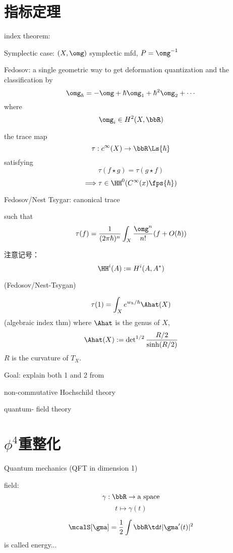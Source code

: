 

\section{指标定理}
index theorem:

Symplectic case: $(X,\omg)$ symplectic mfd,
$P=\omg^{-1}$

Fedosov: a single geometric way
to get deformation quantization and the classification by
$$\omg_{\hbar}=-\omg+\hbar\omg_1+\hbar^2\omg_2+\cdots$$
where
$$\omg_i\in H^2(X,\bbR)$$

\begin{definition}
 the trace map
$$\tau: c^{\infty}(X)\to \bbR\Ls{\hbar}$$
satisfying
$$\tau(f\star g)=\tau(g\star f)$$
$$\Longrightarrow \tau\in \HH^0(C^{\infty}(x)\fps{\hbar})$$

Fedosov/Nest Tsygar: canonical trace

such that
$$\tau(f)=\frac{1}{(2\pi\hbar)^n}
\int_X
  \frac{\omg^n}{n!}
  (f+O(\hbar))$$
\end{definition}

注意记号：
$$\HH^i(A):=H^i(A,A^*)$$


\begin{thm}(Fedosov/Nest-Tsygan)

$$\tau(1)=\int_X e^{w_{\hbar}/\hbar}\Ahat(X)$$
(algebraic index thm)
where $\Ahat$ is the genus of $X$,
$$\Ahat(X):=
\det\nolimits^{1/2}\frac{R/2}{\sinh(R/2)}$$
$R$ is the curvature of $T_X$.
\end{thm}

Goal: explain both 1 and 2 from

non-commutative Hochschild theory

quantum- field theory

\section{$\phi^4$重整化}
\begin{example}Quantum mechanics (QFT in dimension 1)

field:
$$\gamma:\bbR\to\text{a space}$$
$$t\mapsto \gamma(t)$$

$$\mcalS[\gma]=\frac{1}{2}\int\bbR\td t|\gma'(t)|^2$$
is called energy...

\end{example}

